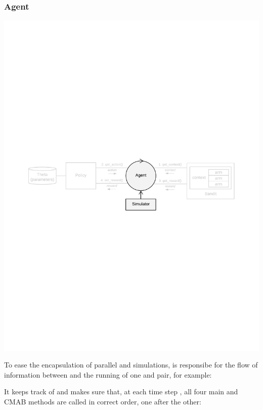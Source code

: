 \documentclass{jss}
\begin{document}
\subsubsection{Agent}

\includegraphics[width=\textwidth]{fig/all_cmab_phases_Part2}

To ease the encapsulation of parallel  and  simulations,  is responsibe for the flow of information between and the running of one  and  pair, for example:


It keeps track of  and makes sure that, at each time step , all four main  and  CMAB methods are called in correct order, one after the other:
\end{document}
